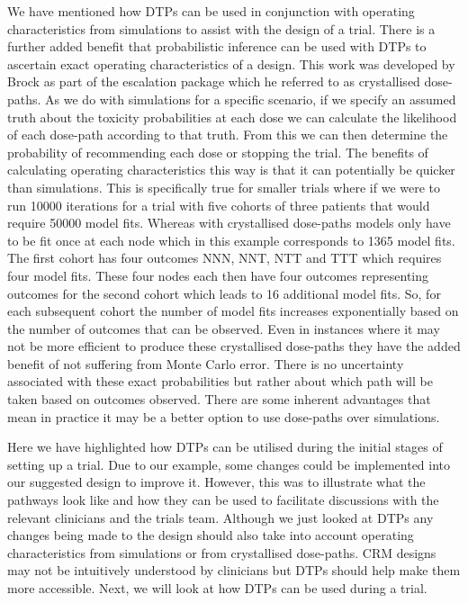 We have mentioned how DTPs can be used in conjunction with operating characteristics from simulations to assist with the design of a trial. There is a further added benefit that probabilistic inference can be used with DTPs to ascertain exact operating characteristics of a design. This work was developed by Brock \cite{brockModularApproachDose2020} as part of the escalation package which he referred to as crystallised dose-paths. As we do with simulations for a specific scenario, if we specify an assumed truth about the toxicity probabilities at each dose we can calculate the likelihood of each dose-path according to that truth. From this we can then determine the probability of recommending each dose or stopping the trial. The benefits of calculating operating characteristics this way is that it can potentially be quicker than simulations. This is specifically true for smaller trials where if we were to run 10000 iterations for a trial with five cohorts of three patients that would require 50000 model fits. Whereas with crystallised dose-paths models only have to be fit once at each node which in this example corresponds to 1365 model fits. The first cohort has four outcomes NNN, NNT, NTT and TTT which requires four model fits. These four nodes each then have four outcomes representing outcomes for the second cohort which leads to 16 additional model fits. So, for each subsequent cohort the number of model fits increases exponentially based on the number of outcomes that can be observed. Even in instances where it may not be more efficient to produce these crystallised dose-paths they have the added benefit of not suffering from Monte Carlo error. There is no uncertainty associated with these exact probabilities but rather about which path will be taken based on outcomes observed. There are some inherent advantages that mean in practice it may be a better option to use dose-paths over simulations. 

Here we have highlighted how DTPs can be utilised during the initial stages of setting up a trial. Due to our example, some changes could be implemented into our suggested design to improve it. However, this was to illustrate what the pathways look like and how they can be used to facilitate discussions with the relevant clinicians and the trials team. Although we just looked at DTPs any changes being made to the design should also take into account operating characteristics from simulations or from crystallised dose-paths. CRM designs may not be intuitively understood by clinicians but DTPs should help make them more accessible. Next, we will look at how DTPs can be used during a trial.  

